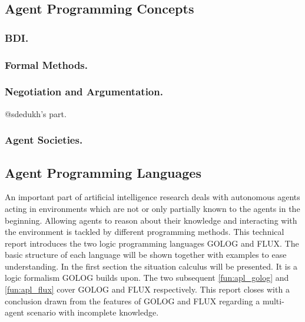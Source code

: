 \subsection{Agent Programming Concepts}
\subsubsection{BDI.}
\subsubsection{Formal Methods.}


\subsubsection{Negotiation and Argumentation.}
@sdedukh's part.

\subsubsection{Agent Societies.}
\subsection{Agent Programming Languages}
An important part of artificial intelligence research deals with autonomous agents acting in environments which are not or only partially known to the agents in the beginning. Allowing agents to reason about their knowledge and interacting with the environment is tackled by different programming methods. This technical report introduces the two logic programming languages GOLOG and FLUX. The basic structure of each language will be shown together with examples to ease understanding. In the first section the situation calculus will be presented. It is a logic formalism GOLOG builds upon. The two subsequent \autoref{fun:apl_golog} and \autoref{fun:apl_flux} cover GOLOG and FLUX respectively. This report closes with a conclusion drawn from the features of GOLOG and FLUX regarding a multi-agent scenario with incomplete knowledge.







